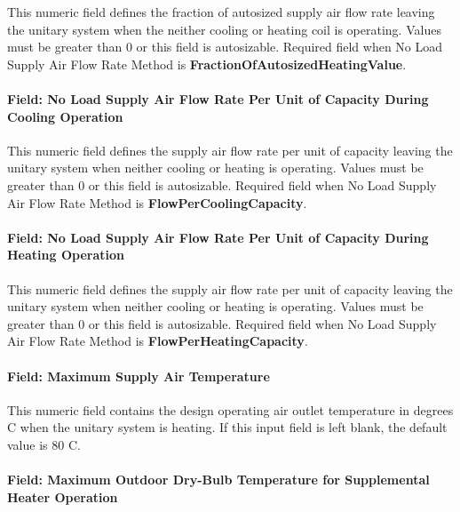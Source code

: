 This numeric field defines the fraction of autosized supply air flow rate leaving the unitary system when the neither cooling or heating coil is operating. Values must be greater than 0 or this field is autosizable. Required field when No Load Supply Air Flow Rate Method is \textbf{FractionOfAutosizedHeatingValue}.

\paragraph{Field: No Load Supply Air Flow Rate Per Unit of Capacity During Cooling Operation}\label{field-no-load-supply-air-flow-rate-per-unit-of-capacity-during-cooling-operation}

This numeric field defines the supply air flow rate per unit of capacity leaving the unitary system when neither cooling or heating is operating. Values must be greater than 0 or this field is autosizable. Required field when No Load Supply Air Flow Rate Method is \textbf{FlowPerCoolingCapacity}.

\paragraph{Field: No Load Supply Air Flow Rate Per Unit of Capacity During Heating Operation}\label{field-no-load-supply-air-flow-rate-per-unit-of-capacity-during-heating-operation}

This numeric field defines the supply air flow rate per unit of capacity leaving the unitary system when neither cooling or heating is operating. Values must be greater than 0 or this field is autosizable. Required field when No Load Supply Air Flow Rate Method is \textbf{FlowPerHeatingCapacity}.

\paragraph{Field: Maximum Supply Air Temperature}\label{field-maximum-supply-air-temperature-000}

This numeric field contains the design operating air outlet temperature in degrees C when the unitary system is heating. If this input field is left blank, the default value is 80 C.

\paragraph{Field: Maximum Outdoor Dry-Bulb Temperature for Supplemental Heater Operation}\label{field-maximum-outdoor-dry-bulb-temperature-for-supplemental-heater-operation}

